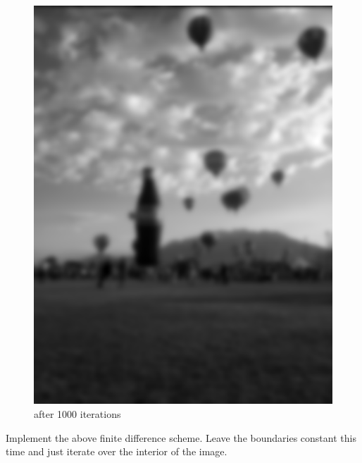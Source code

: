 \begin{figure}[ht]
\begin{minipage}[b]{0.45\linewidth}
\includegraphics[width=\textwidth]{baloon1000}
\caption*{after 1000 iterations}
\end{minipage}
\end{figure}
\vfill
\clearpage

\begin{problem}
Implement the above finite difference scheme.
Leave the boundaries constant this time and just iterate over the interior of the image.
\end{problem}

